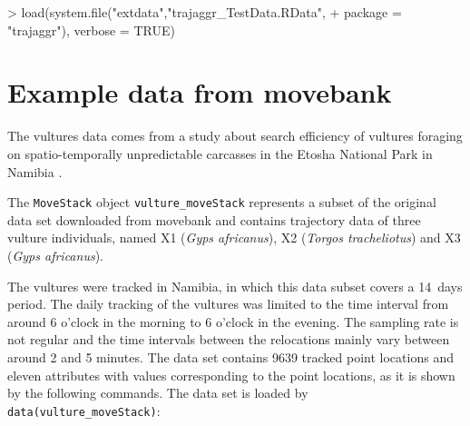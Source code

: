 \documentclass[12pt, oneside, a4paper]{scrbook}
\let\code=\texttt
\begin{document}
\begin{small}
\begin{Schunk}
\begin{Sinput}
> load(system.file("extdata","trajaggr_TestData.RData", 
+                  package = "trajaggr"), verbose = TRUE)
\end{Sinput}
\end{Schunk}
\end{small}

\par\medskip



\section{Example data from movebank}
\label{sec:exampledatamovebank}



The vultures data comes from a study about search efficiency of vultures foraging on spatio-temporally unpredictable carcasses in the Etosha National Park in Namibia \citep{spiegel_factors_2013}.
\par\medskip

The \code{MoveStack} object \code{vulture\_moveStack} represents a subset of the original data set downloaded from movebank and contains trajectory data of three vulture individuals, named X1 (\textit{Gyps africanus}), X2 (\textit{Torgos tracheliotus}) and X3 (\textit{Gyps africanus}). 
\par\medskip

The vultures were tracked in Namibia, in which this data subset covers a 14~days period. The daily tracking of the vultures was limited to the time interval from around 6 o'clock in the morning to 6 o'clock in the evening. The sampling rate is not regular and the time intervals between the relocations mainly vary between around 2 and 5 minutes. The data set contains 9639 tracked point locations and eleven attributes with values corresponding to the point locations, as it is shown by the following commands. The data set is loaded by \code{data(vulture\_moveStack)}:
\par\medskip
\end{document}
